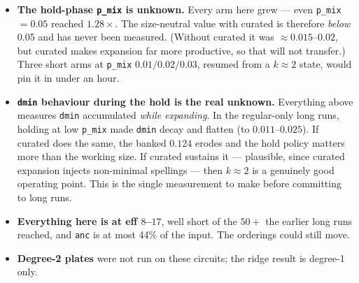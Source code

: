\documentclass[11pt]{article}
\begin{document}
\begin{itemize}
\item \textbf{The hold-phase \texttt{p\_mix} is unknown.} Every arm here grew ---
      even \texttt{p\_mix} $=0.05$ reached $1.28\times$. The size-neutral value
      with curated is therefore \emph{below} 0.05 and has never been measured.
      (Without curated it was ${\approx}0.015$--$0.02$, but curated makes
      expansion far more productive, so that will not transfer.) Three short arms
      at \texttt{p\_mix} $0.01/0.02/0.03$, resumed from a $k\approx2$ state,
      would pin it in under an hour.
\item \textbf{\texttt{dmin} behaviour during the hold is the real unknown.}
      Everything above measures \texttt{dmin} accumulated \emph{while expanding}.
      In the regular-only long runs, holding at low \texttt{p\_mix} made
      \texttt{dmin} decay and flatten (to $0.011$--$0.025$). If curated does the
      same, the banked $0.124$ erodes and the hold policy matters more than the
      working size. If curated sustains it --- plausible, since curated expansion
      injects non-minimal spellings --- then $k \approx 2$ is a genuinely good
      operating point. This is the single measurement to make before committing
      to long runs.
\item \textbf{Everything here is at eff $8$--$17$}, well short of the $50+$ the
      earlier long runs reached, and \texttt{anc} is at most 44\% of the input.
      The orderings could still move.
\item \textbf{Degree-2 plates} were not run on these circuits; the ridge result
      is degree-1 only.
\end{itemize}
\end{document}
